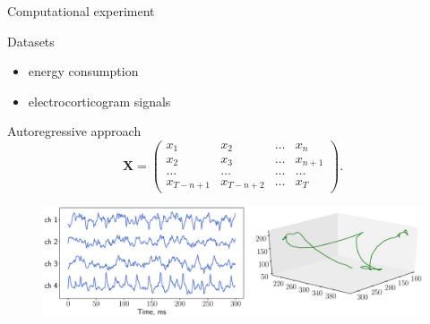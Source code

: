 \documentclass{beamer}
\begin{document}
\begin{frame}{Computational experiment}
\begin{minipage}{0.5\textwidth}
	\begin{block}{Datasets}
		\vspace{0.35cm}
		\begin{itemize}
			\item energy consumption
			\item electrocorticogram signals
		\end{itemize}
	\end{block}
\vspace{0.5cm}
\end{minipage}%
\begin{minipage}{0.5\textwidth}
\begin{block}{Autoregressive approach}
	\footnotesize{
	\[
	\mathbf{X} = 
	\begin{pmatrix}
	x_1 & x_2 & \dots & x_n \\
	x_2 & x_3 & \dots & x_{n+1} \\
	\dots & \dots & \dots & \dots \\
	x_{T-n+1} & x_{T-n+2} & \dots & x_T
	\end{pmatrix}.
	\]}
\end{block}
\end{minipage}

\begin{figure}
	\includegraphics[width=\linewidth]{figs/ecog_data}
\end{figure}
\end{frame}
\end{document}
